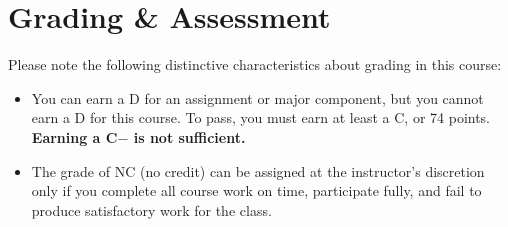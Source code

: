 \documentclass[12pt,oneside]{amsart}	%
\begin{document}
\section{Grading \& Assessment}

Please note the following distinctive characteristics about grading in this course:
\begin{itemize}
	\item You can earn a D for an assignment or major component, but you cannot earn a D for this course. To pass, you must earn at least a C, or 74 points. \textbf{Earning a C$-$ is not sufficient.}
	\item The grade of NC (no credit) can be assigned at the instructor's discretion only if you complete all course work on time, participate fully, and fail to produce satisfactory work for the class.
\end{itemize}
\end{document}
